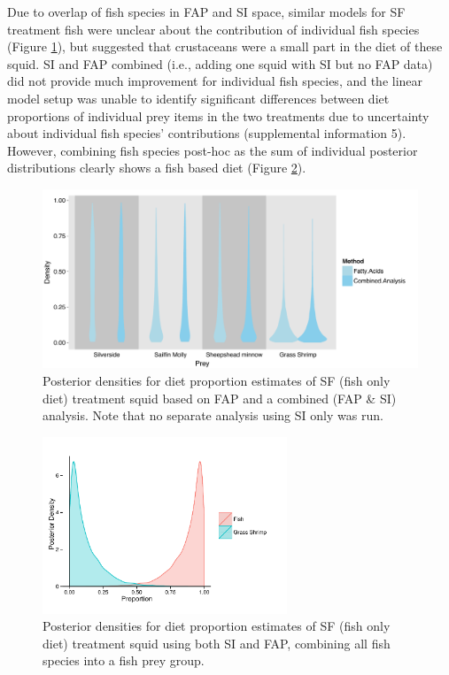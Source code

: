 \documentclass[fleqn,10pt]{wlpeerj}
\begin{document}
Due to overlap of fish species in FAP and SI space, similar models for
SF treatment fish were unclear about the contribution of individual
fish species (Figure \ref{fig:pop_comp_SF}), but suggested that
crustaceans were a small part in the diet of these squid. SI and FAP
combined (i.e., adding one squid with SI but no FAP data) did not
provide much improvement for individual fish species, and the linear model setup was unable to identify significant differences
between diet proportions of individual prey items in the two
treatments due to uncertainty about individual fish species'
contributions (supplemental information 5). However, combining fish species post-hoc as the sum of individual posterior
distributions clearly shows a fish based diet
(Figure \ref{fig:Fish_plot}). 

\begin{figure}
  \begin{center}
    \includegraphics[width=1\textwidth]{figures/SF_comp_plot.pdf}   
    \caption{Posterior densities for diet proportion estimates of SF
      (fish only diet) treatment squid based on FAP and a combined
      (FAP \& SI) analysis. Note that no separate analysis using SI
      only was run.}
    \label{fig:pop_comp_SF}
  \end{center}
\end{figure}

\begin{figure}
  \begin{center}
    \includegraphics[width=0.65\textwidth]{figures/Fish_plot.pdf}   
    \caption{Posterior densities for diet proportion estimates of SF
      (fish only diet) treatment squid using both SI and FAP,
      combining all fish species into a fish prey group.}
    \label{fig:Fish_plot}
  \end{center}
\end{figure}
\end{document}
